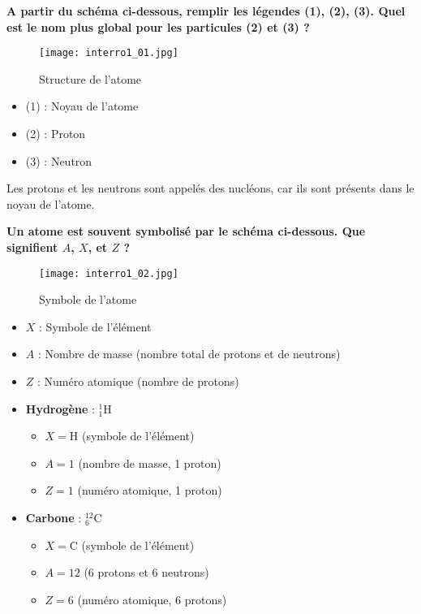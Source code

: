 \documentclass{exam}
\begin{document}
\begin{questions}
  \question[1] \textbf{A partir du schéma ci-dessous, remplir les légendes (1), (2), (3). Quel est le nom plus global pour les particules (2) et (3) ?}

  \begin{figure}[H]
    \centering
    \texttt{[image: interro1\_01.jpg]}
    \caption{\label{} Structure de l'atome}
  \end{figure}

  \begin{itemize}
    \item (1) : Noyau de l'atome
    \item (2) : Proton
    \item (3) : Neutron
  \end{itemize}
  Les protons et les neutrons sont appelés des nucléons, car ils sont présents dans le noyau de l'atome.

  \question[1] \textbf{Un atome est souvent symbolisé par le schéma ci-dessous. Que signifient $A$, $X$, et $Z$ ?}

  \begin{figure}[H]
    \centering
    \texttt{[image: interro1\_02.jpg]}
    \caption{\label{} Symbole de l'atome}
  \end{figure}

  \begin{itemize}
    \item $X$ : Symbole de l'élément
    \item $A$ : Nombre de masse (nombre total de protons et de neutrons)
    \item $Z$ : Numéro atomique (nombre de protons)
  \end{itemize}

  \begin{itemize}
    \item \textbf{Hydrogène} : $_{1}^{1}\text{H}$
    \begin{itemize}
        \item $X = \text{H}$ (symbole de l'élément)
        \item $A = 1$ (nombre de masse, 1 proton)
        \item $Z = 1$ (numéro atomique, 1 proton)
    \end{itemize}

    \item \textbf{Carbone} : $_{6}^{12}\text{C}$
    \begin{itemize}
        \item $X = \text{C}$ (symbole de l'élément)
        \item $A = 12$ (6 protons et 6 neutrons)
        \item $Z = 6$ (numéro atomique, 6 protons)
    \end{itemize}


\end{itemize}
\end{questions}
\end{document}
